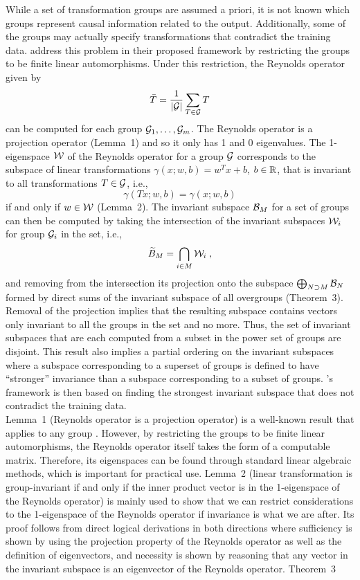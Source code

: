 While a set of transformation groups are assumed a priori, it is not known which groups represent causal information related to the output. Additionally, some of the groups may actually specify transformations that contradict the training data. \citeauthor{Mouli:2021} address this problem in their proposed framework by restricting the groups to be finite linear automorphisms. Under this restriction, the Reynolds operator given by
\[
\bar{T} = \frac{1}{|\mathcal{G}|}\sum_{T\in\mathcal{G}}T
\]
can be computed for each group $\mathcal{G}_1,\ldots,\mathcal{G}_m$. The Reynolds operator is a projection operator (Lemma~1) and so it only has 1 and 0 eigenvalues. The 1-eigenspace $\mathcal{W}$ of the Reynolds operator for a group $\mathcal{G}$ corresponds to the subspace of linear transformations $\gamma(x;w,b)=w^Tx+b$, $b\in\mathbb{R}$, that is invariant to all transformations $T\in\mathcal{G}$, i.e.,
\[
\gamma(Tx;w,b) = \gamma(x;w,b)
\]
if and only if $w\in\mathcal{W}$ (Lemma~2). The invariant subspace $\mathcal{B}_M$ for a set of groups can then be computed by taking the intersection of the invariant subspaces $\mathcal{W}_i$ for group $\mathcal{G}_i$ in the set, i.e.,
\[
\widetilde{B}_M = \bigcap_{i\in M} \mathcal{W}_i \;,
\]
and removing from the intersection its projection onto the subspace $\bigoplus_{N\supset M}\mathcal{B}_N$ formed by direct sums of the invariant subspace of all overgroups (Theorem~3). Removal of the projection implies that the resulting subspace contains vectors only invariant to all the groups in the set and no more. Thus, the set of invariant subspaces that are each computed from a subset in the power set of groups are disjoint. This result also implies a partial ordering on the invariant subspaces where a subspace corresponding to a superset of groups is defined to have ``stronger'' invariance than a subspace corresponding to a subset of groups. \citeauthor{Mouli:2021}'s framework is then based on finding the strongest invariant subspace that does not contradict the training data.
\\

Lemma~1 (Reynolds operator is a projection operator) is a well-known result that applies to any group \parencite{Mumford:1994}. However, by restricting the groups to be finite linear automorphisms, the Reynolds operator itself takes the form of a computable matrix. Therefore, its eigenspaces can be found through standard linear algebraic methods, which is important for practical use. Lemma~2 (linear transformation is group-invariant if and only if the inner product vector is in the 1-eigenspace of the Reynolds operator) is mainly used to show that we can restrict considerations to the 1-eigenspace of the Reynolds operator if invariance is what we are after. Its proof follows from direct logical derivations in both directions where sufficiency is shown by using the projection property of the Reynolds operator as well as the definition of eigenvectors, and necessity is shown by reasoning that any vector in the invariant subspace is an eigenvector of the Reynolds operator. Theorem~3 \todo


